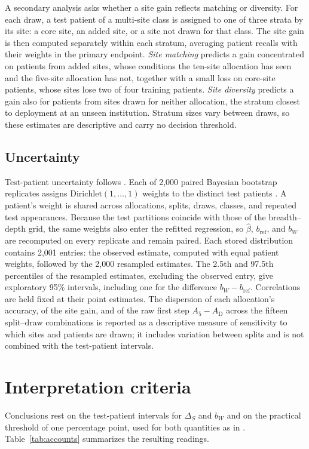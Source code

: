 \documentclass[11pt]{article}
\begin{document}
A secondary analysis asks whether a site gain reflects matching or diversity. For each draw, a test patient of a multi-site class is assigned to one of three strata by its site: a core site, an added site, or a site not drawn for that class. The site gain is then computed separately within each stratum, averaging patient recalls with their weights in the primary endpoint. \emph{Site matching} predicts a gain concentrated on patients from added sites, whose conditions the ten-site allocation has seen and the five-site allocation has not, together with a small loss on core-site patients, whose sites lose two of four training patients. \emph{Site diversity} predicts a gain also for patients from sites drawn for neither allocation, the stratum closest to deployment at an unseen institution. Stratum sizes vary between draws, so these estimates are descriptive and carry no decision threshold.

\subsection{Uncertainty}
\label{sec:uncertainty}
Test-patient uncertainty follows \citet{queisler2026effectiveSupport}. Each of 2,000 paired Bayesian bootstrap replicates assigns $\mathrm{Dirichlet}(1,\ldots,1)$ weights to the distinct test patients \citep{rubin1981bayesian}. A patient's weight is shared across allocations, splits, draws, classes, and repeated test appearances. Because the test partitions coincide with those of the breadth--depth grid, the same weights also enter the refitted regression, so $\hat\beta$, $b_{\mathrm{ref}}$, and $b_W$ are recomputed on every replicate and remain paired. Each stored distribution contains 2,001 entries: the observed estimate, computed with equal patient weights, followed by the 2,000 resampled estimates. The 2.5th and 97.5th percentiles of the resampled estimates, excluding the observed entry, give exploratory 95\% intervals, including one for the difference $b_W-b_{\mathrm{ref}}$. Correlations are held fixed at their point estimates. The dispersion of each allocation's accuracy, of the site gain, and of the raw first step $A_5-A_{\mathrm D}$ across the fifteen split--draw combinations is reported as a descriptive measure of sensitivity to which sites and patients are drawn; it includes variation between splits and is not combined with the test-patient intervals.

\section{Interpretation criteria}
\label{sec:interpretation}
Conclusions rest on the test-patient intervals for $\Delta_S$ and $b_W$ and on the practical threshold of one percentage point, used for both quantities as in \citet{queisler2026multidirectionalRedundancy}. Table~\ref{tab:accounts} summarizes the resulting readings.
\end{document}
